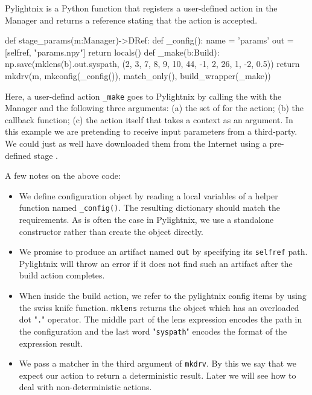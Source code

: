 Pylightnix  is a Python function that
registers a user-defined action in the Manager and returns a
 reference stating that the action is
accepted.

\begin{pythontexcode}
def stage_params(m:Manager)->DRef:
  def _config():
    name = 'params'
    out = [selfref, "params.npy"]
    return locals()
  def _make(b:Build):
    np.save(mklens(b).out.syspath, (2, 3, 7, 8, 9, 10, 44, -1, 2, 26, 1, -2, 0.5))
  return mkdrv(m, mkconfig(_config()), match_only(), build_wrapper(_make))
\end{pythontexcode}

Here, a user-defind action \texttt{\_make} goes to Pylightnix by calling the
 with the Manager and the following three
arguments: (a) the set of  for the
action; (b) the  callback function; (c)
the action itself that takes a  context as
an argument. In this example we are pretending to receive input parameters from
a third-party. We could just as well have downloaded them from the Internet using
a pre-defined stage .

\hfill \break \noindent
A few notes on the above code:

\begin{itemize}
  \item We define configuration object by reading a local variables of a helper
    function named \texttt{\_config()}. The resulting dictionary should match
    the  requirements. As is often the
    case in Pylightnix, we use a standalone
     constructor rather than create the
    object directly.
  \item We promise to produce an artifact named \texttt{out} by specifying its
    \texttt{selfref} path. Pylightnix will throw an error if it does not find
    such an artifact after the build action completes.
  \item When inside the build action, we refer to the pylightnix config items by
    using the  swiss knife function.
    \texttt{mklens} returns the  object which
    has an overloaded dot "\texttt{.}" operator. The middle part of the lens
    expression encodes the path in the configuration and the last word
    "\texttt{syspath}" encodes the format of the expression result.
  \item We pass a  matcher in
    the third argument of \texttt{mkdrv}. By this we say that we expect our
    action to return a deterministic result. Later we will see how to deal with
    non-deterministic actions.
  \end{itemize}

